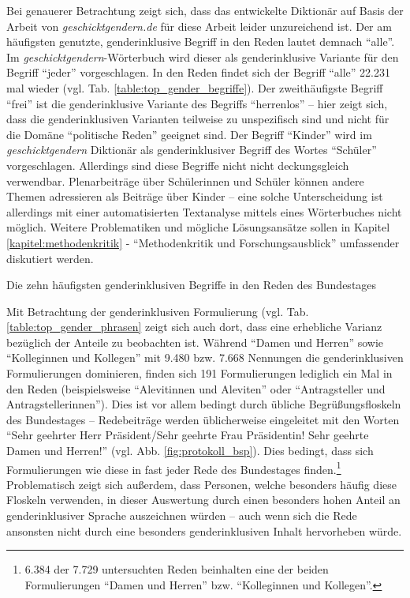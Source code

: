 \documentclass[12pt, 
    twoside=false, 
    bibliography=totoc, 
    numbers=endperiod, 
    headings=normal, 
    toc=chapterentrydotfill
    ]{scrbook}
\begin{document}
Bei genauerer Betrachtung zeigt sich, dass das entwickelte Diktionär auf Basis der Arbeit von \emph{geschicktgendern.de} für diese Arbeit leider unzureichend ist. Der am häufigsten genutzte, genderinklusive Begriff in den Reden lautet demnach \enquote{alle}. Im \emph{geschicktgendern}-Wörterbuch wird dieser als genderinklusive Variante für den Begriff \enquote{jeder} vorgeschlagen. In den Reden findet sich der Begriff \enquote{alle} 22.231 mal wieder (vgl. Tab. \ref{table:top_gender_begriffe}). Der zweithäufigste Begriff \enquote{frei} ist die genderinklusive Variante des Begriffs \enquote{herrenlos} -- hier zeigt sich, dass die genderinklusiven Varianten teilweise zu unspezifisch sind und nicht für die Domäne \enquote{politische Reden} geeignet sind. Der Begriff \enquote{Kinder} wird im \emph{geschicktgendern} Diktionär als genderinklusiver Begriff des Wortes \enquote{Schüler} vorgeschlagen. Allerdings sind diese Begriffe nicht nicht deckungsgleich verwendbar. Plenarbeiträge über Schülerinnen und Schüler können andere Themen adressieren als Beiträge über Kinder -- eine solche Unterscheidung ist allerdings mit einer automatisierten Textanalyse mittels eines Wörterbuches nicht möglich. Weitere Problematiken und mögliche Lösungsansätze sollen in Kapitel \ref{kapitel:methodenkritik} - \enquote{Methodenkritik und Forschungsausblick} umfassender diskutiert werden. 

\begin{table}
    \centering
    \caption[Die zehn häufigsten genderinklusiven Begriffe in den Reden des Bundestages]{Die zehn häufigsten genderinklusiven Begriffe in den Reden des Bundestages}
    
    \label{table:top_gender_begriffe}
\end{table}

Mit Betrachtung der genderinklusiven Formulierung (vgl. Tab. \ref{table:top_gender_phrasen} zeigt sich auch dort, dass eine erhebliche Varianz bezüglich der Anteile zu beobachten ist. Während \enquote{Damen und Herren} sowie \enquote{Kolleginnen und Kollegen} mit 9.480 bzw. 7.668 Nennungen die genderinklusiven Formulierungen dominieren, finden sich 191 Formulierungen lediglich ein Mal in den Reden (beispielsweise \enquote{Alevitinnen und Aleviten} oder \enquote{Antragsteller und Antragstellerinnen}). Dies ist vor allem bedingt durch übliche Begrüßungsfloskeln des Bundestages -- Redebeiträge werden üblicherweise eingeleitet mit den Worten \enquote{Sehr geehrter Herr Präsident/Sehr geehrte Frau Präsidentin! Sehr geehrte Damen und Herren!} (vgl. Abb. \ref{fig:protokoll_bsp}). Dies bedingt, dass sich Formulierungen wie diese in fast jeder Rede des Bundestages finden.\footnote{6.384 der 7.729 untersuchten Reden beinhalten eine der beiden Formulierungen \enquote{Damen und Herren} bzw. \enquote{Kolleginnen und Kollegen}.}
Problematisch zeigt sich außerdem, dass Personen, welche besonders häufig diese Floskeln verwenden, in dieser Auswertung durch einen besonders hohen Anteil an genderinklusiver Sprache auszeichnen würden -- auch wenn sich die Rede ansonsten nicht durch eine besonders genderinklusiven Inhalt hervorheben würde.
\end{document}
